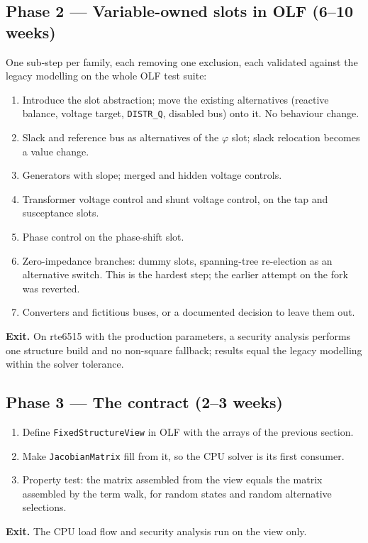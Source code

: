\documentclass[11pt,a4paper]{article}
\newcommand{\code}[1]{\texttt{\small #1}}
\begin{document}
\subsection*{Phase 2 --- Variable-owned slots in OLF \hfill (6--10 weeks)}
One sub-step per family, each removing one exclusion, each validated against the legacy
modelling on the whole OLF test suite:
\begin{enumerate}
\item Introduce the slot abstraction; move the existing alternatives (reactive balance,
      voltage target, \code{DISTR\_Q}, disabled bus) onto it. No behaviour change.
\item Slack and reference bus as alternatives of the $\varphi$ slot; slack relocation
      becomes a value change.
\item Generators with slope; merged and hidden voltage controls.
\item Transformer voltage control and shunt voltage control, on the tap and susceptance
      slots.
\item Phase control on the phase-shift slot.
\item Zero-impedance branches: dummy slots, spanning-tree re-election as an alternative
      switch. This is the hardest step; the earlier attempt on the fork was reverted.
\item Converters and fictitious buses, or a documented decision to leave them out.
\end{enumerate}
\textbf{Exit.} On rte6515 with the production parameters, a security analysis performs
one structure build and no non-square fallback; results equal the legacy modelling
within the solver tolerance.

\subsection*{Phase 3 --- The contract \hfill (2--3 weeks)}
\begin{enumerate}
\item Define \code{FixedStructureView} in OLF with the arrays of the previous section.
\item Make \code{JacobianMatrix} fill from it, so the CPU solver is its first consumer.
\item Property test: the matrix assembled from the view equals the matrix assembled by
      the term walk, for random states and random alternative selections.
\end{enumerate}
\textbf{Exit.} The CPU load flow and security analysis run on the view only.
\end{document}
